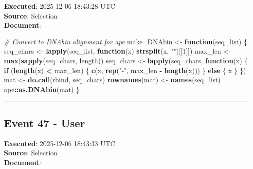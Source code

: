 \documentclass[
  11pt,
]{article}
\newenvironment{Shaded}{\begin{snugshade}}{\end{snugshade}}
\newcommand{\CommentTok}[1]{\textcolor[rgb]{0.56,0.35,0.01}{\textit{#1}}}
\newcommand{\ControlFlowTok}[1]{\textcolor[rgb]{0.13,0.29,0.53}{\textbf{#1}}}
\newcommand{\DecValTok}[1]{\textcolor[rgb]{0.00,0.00,0.81}{#1}}
\newcommand{\FunctionTok}[1]{\textcolor[rgb]{0.13,0.29,0.53}{\textbf{#1}}}
\newcommand{\NormalTok}[1]{#1}
\newcommand{\OtherTok}[1]{\textcolor[rgb]{0.56,0.35,0.01}{#1}}
\newcommand{\SpecialCharTok}[1]{\textcolor[rgb]{0.81,0.36,0.00}{\textbf{#1}}}
\newcommand{\StringTok}[1]{\textcolor[rgb]{0.31,0.60,0.02}{#1}}
\begin{document}
\textbf{Executed}: 2025-12-06 18:43:28 UTC\\
\textbf{Source}: Selection\\
\textbf{Document}:

\begin{Shaded}
\begin{Highlighting}[]
\CommentTok{\# Convert to DNAbin alignment for ape}
\NormalTok{make\_DNAbin }\OtherTok{\textless{}{-}} \ControlFlowTok{function}\NormalTok{(seq\_list) \{}
\NormalTok{  seq\_chars }\OtherTok{\textless{}{-}} \FunctionTok{lapply}\NormalTok{(seq\_list, }\ControlFlowTok{function}\NormalTok{(x) }\FunctionTok{strsplit}\NormalTok{(x, }\StringTok{""}\NormalTok{)[[}\DecValTok{1}\NormalTok{]])}
\NormalTok{  max\_len }\OtherTok{\textless{}{-}} \FunctionTok{max}\NormalTok{(}\FunctionTok{sapply}\NormalTok{(seq\_chars, length))}
\NormalTok{  seq\_chars }\OtherTok{\textless{}{-}} \FunctionTok{lapply}\NormalTok{(seq\_chars, }\ControlFlowTok{function}\NormalTok{(x) \{}
    \ControlFlowTok{if}\NormalTok{ (}\FunctionTok{length}\NormalTok{(x) }\SpecialCharTok{\textless{}}\NormalTok{ max\_len) \{}
      \FunctionTok{c}\NormalTok{(x, }\FunctionTok{rep}\NormalTok{(}\StringTok{"{-}"}\NormalTok{, max\_len }\SpecialCharTok{{-}} \FunctionTok{length}\NormalTok{(x)))}
\NormalTok{    \} }\ControlFlowTok{else}\NormalTok{ \{}
\NormalTok{      x}
\NormalTok{    \}}
\NormalTok{  \})}
\NormalTok{  mat }\OtherTok{\textless{}{-}} \FunctionTok{do.call}\NormalTok{(rbind, seq\_chars)}
  \FunctionTok{rownames}\NormalTok{(mat) }\OtherTok{\textless{}{-}} \FunctionTok{names}\NormalTok{(seq\_list)}
\NormalTok{  ape}\SpecialCharTok{::}\FunctionTok{as.DNAbin}\NormalTok{(mat)}
\NormalTok{\}}
\end{Highlighting}
\end{Shaded}

\begin{center}\rule{0.5\linewidth}{0.5pt}\end{center}

\subsection{Event 47 - User}\label{event-47---user}

\textbf{Executed}: 2025-12-06 18:43:33 UTC\\
\textbf{Source}: Selection\\
\textbf{Document}:
\end{document}
